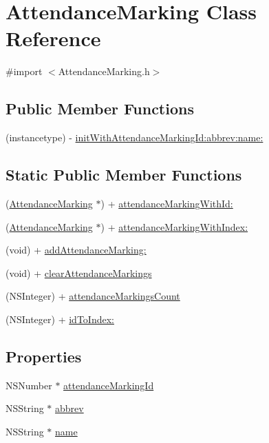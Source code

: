 \hypertarget{interface_attendance_marking}{\section{\-Attendance\-Marking \-Class \-Reference}
\label{interface_attendance_marking}
}


{\ttfamily \#import $<$\-Attendance\-Marking.\-h$>$}

\subsection*{\-Public \-Member \-Functions}
\begin{DoxyCompactItemize}
\item 
(instancetype) -\/ \hyperlink{interface_attendance_marking_a6f38236cf3c6b23f42ebe44036cf8496}{init\-With\-Attendance\-Marking\-Id\-:abbrev\-:name\-:}
\end{DoxyCompactItemize}
\subsection*{\-Static \-Public \-Member \-Functions}
\begin{DoxyCompactItemize}
\item 
(\hyperlink{interface_attendance_marking}{\-Attendance\-Marking} $\ast$) + \hyperlink{interface_attendance_marking_a8433859ec71fc8803abc240a003f3810}{attendance\-Marking\-With\-Id\-:}
\item 
(\hyperlink{interface_attendance_marking}{\-Attendance\-Marking} $\ast$) + \hyperlink{interface_attendance_marking_a864de84c57b2c40cab4c11f81b593049}{attendance\-Marking\-With\-Index\-:}
\item 
(void) + \hyperlink{interface_attendance_marking_a8b7521298b1e5f2da13a553c07b96641}{add\-Attendance\-Marking\-:}
\item 
(void) + \hyperlink{interface_attendance_marking_aac7841ec88daef3846aef57eb3aef678}{clear\-Attendance\-Markings}
\item 
(\-N\-S\-Integer) + \hyperlink{interface_attendance_marking_a18d628d46cf571cb46ac74e514903d88}{attendance\-Markings\-Count}
\item 
(\-N\-S\-Integer) + \hyperlink{interface_attendance_marking_a47c3e10b3de328a9acac4b61394e4751}{id\-To\-Index\-:}
\end{DoxyCompactItemize}
\subsection*{\-Properties}
\begin{DoxyCompactItemize}
\item 
\-N\-S\-Number $\ast$ \hyperlink{interface_attendance_marking_a211012d0e662142f3b002b57f133b0db}{attendance\-Marking\-Id}
\item 
\-N\-S\-String $\ast$ \hyperlink{interface_attendance_marking_af637cdd49ba462876b3fe6e6957049fc}{abbrev}
\item 
\-N\-S\-String $\ast$ \hyperlink{interface_attendance_marking_a235155acb5a8b489b9829a09b6ac4b93}{name}
\end{DoxyCompactItemize}


